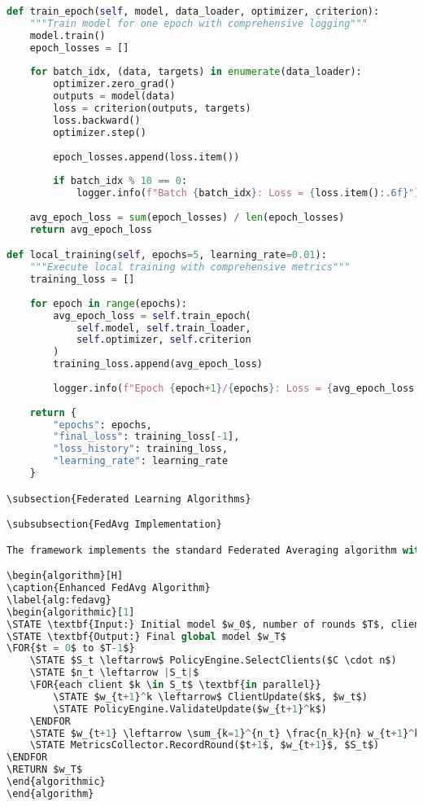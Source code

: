 \begin{lstlisting}[language=Python, caption=Training Loop with Loss Tracking]
def train_epoch(self, model, data_loader, optimizer, criterion):
    """Train model for one epoch with comprehensive logging"""
    model.train()
    epoch_losses = []
    
    for batch_idx, (data, targets) in enumerate(data_loader):
        optimizer.zero_grad()
        outputs = model(data)
        loss = criterion(outputs, targets)
        loss.backward()
        optimizer.step()
        
        epoch_losses.append(loss.item())
        
        if batch_idx % 10 == 0:
            logger.info(f"Batch {batch_idx}: Loss = {loss.item():.6f}")
    
    avg_epoch_loss = sum(epoch_losses) / len(epoch_losses)
    return avg_epoch_loss

def local_training(self, epochs=5, learning_rate=0.01):
    """Execute local training with comprehensive metrics"""
    training_loss = []
    
    for epoch in range(epochs):
        avg_epoch_loss = self.train_epoch(
            self.model, self.train_loader, 
            self.optimizer, self.criterion
        )
        training_loss.append(avg_epoch_loss)
        
        logger.info(f"Epoch {epoch+1}/{epochs}: Loss = {avg_epoch_loss:.6f}")
    
    return {
        "epochs": epochs,
        "final_loss": training_loss[-1],
        "loss_history": training_loss,
        "learning_rate": learning_rate
    }

\subsection{Federated Learning Algorithms}

\subsubsection{FedAvg Implementation}

The framework implements the standard Federated Averaging algorithm with enhancements:

\begin{algorithm}[H]
\caption{Enhanced FedAvg Algorithm}
\label{alg:fedavg}
\begin{algorithmic}[1]
\STATE \textbf{Input:} Initial model $w_0$, number of rounds $T$, client fraction $C$
\STATE \textbf{Output:} Final global model $w_T$
\FOR{$t = 0$ to $T-1$}
    \STATE $S_t \leftarrow$ PolicyEngine.SelectClients($C \cdot n$)
    \STATE $n_t \leftarrow |S_t|$
    \FOR{each client $k \in S_t$ \textbf{in parallel}}
        \STATE $w_{t+1}^k \leftarrow$ ClientUpdate($k$, $w_t$)
        \STATE PolicyEngine.ValidateUpdate($w_{t+1}^k$)
    \ENDFOR
    \STATE $w_{t+1} \leftarrow \sum_{k=1}^{n_t} \frac{n_k}{n} w_{t+1}^k$
    \STATE MetricsCollector.RecordRound($t+1$, $w_{t+1}$, $S_t$)
\ENDFOR
\RETURN $w_T$
\end{algorithmic}
\end{algorithm}


\end{lstlisting}
